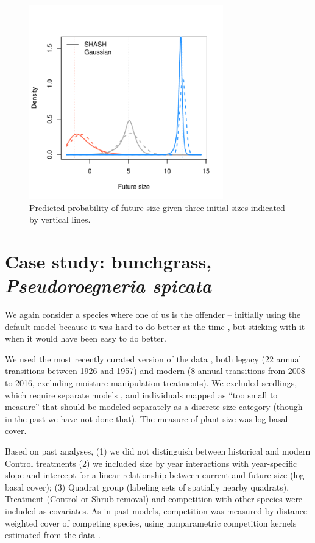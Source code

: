 \documentclass[11pt]{article}
\begin{document}
{ \begin{figure}
\centering
\includegraphics[width=0.75\textwidth]{figures/cactus_growth_compare}
\caption{Predicted probability of future size given three initial sizes indicated by vertical lines.}
\label{fig:cactus_growth_compare}
\end{figure} 

\clearpage   

\section{Case study: bunchgrass, \emph{Pseudoroegneria spicata}}

We again consider a species where one of us is the offender -- initially using the default model because 
it was hard to do better at the time \citep{adler-etal-2010}, but sticking with it 
\citep[e.g.,][]{Tredennick2018, Adler-2018} when it would have been easy to do better. 

We used the most recently curated version of the data \citep[][at doi.org/10.5061/dryad.96dn293]{Adler-2018},
both legacy (22 annual transitions between 1926 and 1957) and modern (8 annual transitions from
2008 to 2016, excluding moisture manipulation treatments). We excluded seedlings, which require separate models
\citep{Chu-2014a, Chu-2015, snyder-ellner-2018}, and individuals mapped as ``too small to measure'' that should be modeled separately
as a discrete size category (though in the past we have not done that). The measure of plant size was log basal cover. 

Based on past analyses, (1) we did not distinguish between historical and 
modern Control treatments \citep{Adler-2018} (2) we included size by year interactions with year-specific slope and intercept
for a linear relationship between current and future size (log basal cover); (3) Quadrat group (labeling sets of spatially
nearby quadrats), Treatment (Control or Shrub removal) and competition with other species were included as covariates. 
As in past models, competition was measured by distance-weighted cover of competing species, using nonparametric competition
kernels estimated from the data \citep{Teller-2016}. 

}
\end{document}
